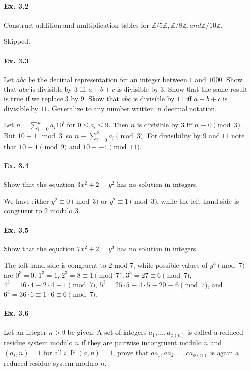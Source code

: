\documentclass[notitlepage]{article}
\theoremstyle{definition}
\newcommand\Z{\mathbb{Z}}
\begin{document}
\paragraph{Ex. 3.2}
Construct addition and multiplication tables for $\Z/5\Z, \Z/8\Z, and
\Z/10\Z$.

Skipped.

\paragraph{Ex. 3.3}
Let $abc$ be the decimal representation for an integer between $1$ and
$1000$. Show that $abc$ is divisible by $3$ iff $a + b + c$ is
divisible by $3$. Show that the same result is true if we replace $3$
by $9$. Show that $abc$ is divisible by $11$ iff $a - b + c$ is
divisible by $11$.  Generalize to any number written in decimal
notation.

Let $n = \sum_{i=0}^k a_i 10^i$ for $0 \leq a_i \leq 9$. Then $n$ is
divisible by $3$ iff $n \equiv 0 \pmod 3$. But $10 \equiv 1 \mod 3$,
so $n \equiv \sum_{i=0}^k a_i \pmod 3$. For divisibility by $9$ and
$11$ note that $10 \equiv 1 \pmod 9$ and $10 \equiv -1 \pmod {11}$.

\paragraph{Ex. 3.4}
Show that the equation $3x^2 + 2 = y^2$ has no solution in integers.

We have either $y^2 \equiv 0 \pmod 3$ or $y^2 \equiv 1 \pmod 3$, while
the left hand side is congruent to $2$ modulo $3$.

\paragraph{Ex. 3.5}
Show that the equation $7x^2 + 2 = y^3$ has no solution in integers.

The left hand side is congruent to $2$ mod $7$, while possible values
of $y^3 \pmod 7$ are $0^3 = 0$, $1^3 = 1$, $2^3 = 8 \equiv 1 \pmod 7$,
$3^3 = 27 \equiv 6 \pmod 7$, $4^3 = 16 \cdot 4 \equiv 2 \cdot 4 \equiv
1 \pmod 7$, $5^3 = 25 \cdot 5 \equiv 4 \cdot 5 \equiv 20 \equiv 6
\pmod 7$, and $6^3 = 36 \cdot 6 \equiv 1 \cdot 6 \equiv 6 \pmod 7$.

\paragraph{Ex. 3.6}
Let an integer $n > 0$ be given. A set of integers $a_1, \ldots,
a_{\phi(n)}$ is called a reduced residue system modulo $n$ if they are
pairwise incongruent modulo $n$ and $(a_i, n) = 1$ for all $i$. If
$(a, n) = 1$, prove that $aa_1 , aa_2, \ldots, aa_{\phi(n)}$ is again
a reduced residue system modulo $n$.
\end{document}
